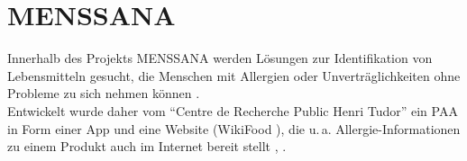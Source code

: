 \section{\acs{MENSSANA}}
\label{sec:menssana}

Innerhalb des Projekts \ac{MENSSANA} werden Lösungen zur
Identifikation von Lebensmitteln gesucht, die Menschen mit Allergien
oder Unverträglichkeiten ohne Probleme zu sich nehmen können
\cite{ahsr07}.\\
Entwickelt wurde daher vom "`Centre de Recherche Public Henri Tudor"'
ein \ac{PAA} in Form einer \ac{App} und eine Website (WikiFood
), die u.\,a.
Allergie-Informationen zu einem Produkt auch im Internet bereit
stellt \cite{arfhhm08}, .

\begin{figure}[ht]
	\centering
	\begin{subfigure}[b]{0.45\textwidth}

\end{subfigure}
\end{figure}
